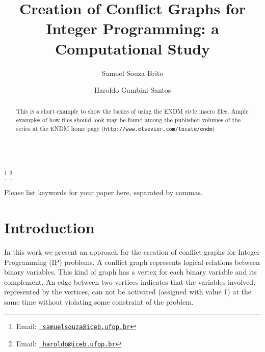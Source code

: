 \documentclass{endm}
\begin{document}
\begin{verbatim}\end{verbatim}\vspace{2.5cm}

\begin{frontmatter}

\title{Creation of Conflict Graphs for Integer Programming: a Computational Study}

\author{Samuel Souza Brito}
\address{Computing Department\\ Universidade Federal de Ouro Preto - UFOP\\ Ouro Preto, Brazil}

\author{Haroldo Gambini Santos}
\address{Computing Department\\ Universidade Federal de Ouro Preto - UFOP\\ Ouro Preto, Brazil}
\thanks[myemail]{Email:
   \href{mailto:samuelsouza@iceb.ufop.br} {\texttt{\normalshape
   samuelsouza@iceb.ufop.br}}} \thanks[coemail]{Email:
   \href{mailto:haroldo@iceb.ufop.br} {\texttt{\normalshape
   haroldo@iceb.ufop.br}}}

\begin{abstract}
This is a short example to show the basics of using the ENDM style
macro files. Ample examples of how files should look may be found
among the published volumes of the series at the ENDM home page
({\texttt{http://www.elsevier.com/locate/endm}})
\end{abstract}

\begin{keyword}
Please list keywords for your paper here, separated by commas.
\end{keyword}

\end{frontmatter}


\section{Introduction}\label{intro}

In this work we present an approach for the creation of conflict graphs for Integer Programming (IP) problems. A conflict graph represents logical relations between binary variables. This kind of graph has a vertex for each binary variable and its complement. An edge between two vertices indicates that the variables involved, represented by the vertices, can not be activated (assigned with value 1) at the same time without violating some constraint of the problem.
\end{document}
